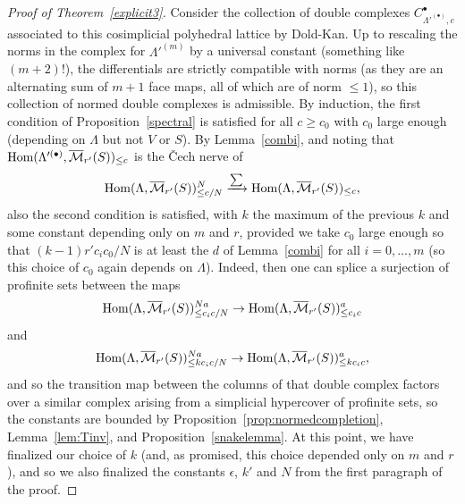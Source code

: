 \begin{proof}[Proof of Theorem~\ref{explicit3}]
Consider the collection of double complexes $C_{\Lambda'^{(\bullet)},c}^\bullet$ associated to this cosimplicial polyhedral lattice by Dold-Kan. Up to rescaling the norms in the complex for $\Lambda'^{(m)}$ by a universal constant (something like $(m+2)!$), the differentials are strictly compatible with norms (as they are an alternating sum of $m+1$ face maps, all of which are of norm $\leq 1$), so this collection of normed double complexes is admissible. By induction, the first condition of Proposition~\ref{spectral} is satisfied for all $c\geq c_0$ with $c_0$ large enough (depending on $\Lambda$ but not $V$ or $S$). By Lemma~\ref{combi}, and noting that $\operatorname{Hom}(\Lambda'^{(\bullet)},\overline{\mathcal M}_{r'}(S))_{\leq c}$ is the \v{C}ech nerve of
\[
\operatorname{Hom}(\Lambda,\overline{\mathcal M}_{r'}(S))_{\leq c/N}^N\xrightarrow{\sum} \operatorname{Hom}(\Lambda,\overline{\mathcal M}_{r'}(S))_{\leq c},
\]
also the second condition is satisfied, with $k$ the maximum of the previous $k$ and some constant depending only on $m$ and $r$, provided we take $c_0$ large enough so that $(k-1)r'c_ic_0/N$ is at least the $d$ of Lemma~\ref{combi} for all $i=0,\ldots,m$ (so this choice of $c_0$ again depends on $\Lambda$). Indeed, then one can splice a surjection of profinite sets between the maps
\[
\operatorname{Hom}(\Lambda,\overline{\mathcal M}_{r'}(S))_{\leq c_ic/N}^{Na}\to\operatorname{Hom}(\Lambda,\overline{\mathcal M}_{r'}(S))_{\leq c_ic}^a
\]
and
\[
\operatorname{Hom}(\Lambda,\overline{\mathcal M}_{r'}(S))_{\leq kc_ic/N}^{Na}\to \operatorname{Hom}(\Lambda,\overline{\mathcal M}_{r'}(S))_{\leq kc_ic}^a,
\]
and so the transition map between the columns of that double complex factors over a similar complex arising from a simplicial hypercover of profinite sets, so the constants are bounded by Proposition~\ref{prop:normedcompletion}, Lemma~\ref{lem:Tinv}, and Proposition~\ref{snakelemma}. At this point, we have finalized our choice of $k$ (and, as promised, this choice depended only on $m$ and $r$), and so we also finalized the constants $\epsilon$, $k'$ and $N$ from the first paragraph of the proof.


\end{proof}
